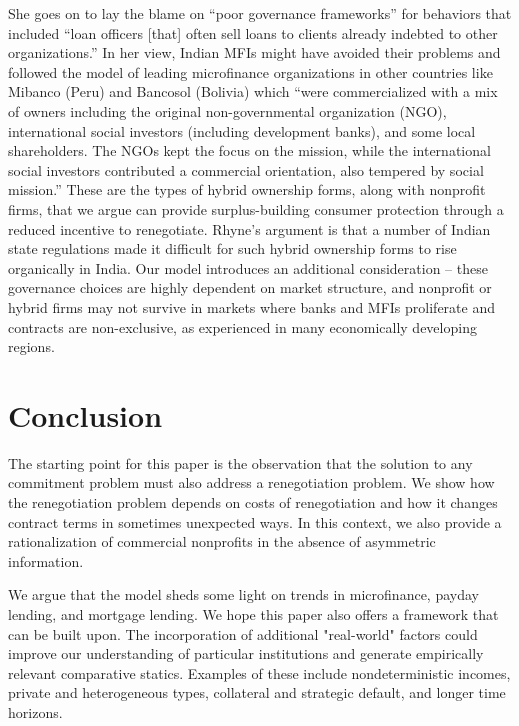 \documentclass[11pt,english]{article}
\theoremstyle{plain}
\theoremstyle{definition}
\begin{document}
She goes on to lay the blame on ``poor governance frameworks\textquotedblright{}
for behaviors that included ``loan officers {[}that{]} often sell
loans to clients already indebted to other organizations.'' In her
view, Indian MFIs might have avoided their problems and followed the
model of leading microfinance organizations in other countries like
Mibanco (Peru) and Bancosol (Bolivia) which ``were commercialized
with a mix of owners including the original non-governmental organization
(NGO), international social investors (including development banks),
and some local shareholders. The NGOs kept the focus on the mission,
while the international social investors contributed a commercial
orientation, also tempered by social mission.'' These are the types
of hybrid ownership forms, along with nonprofit firms, that we argue
can provide surplus-building consumer protection through a reduced
incentive to renegotiate. Rhyne's argument is that a number of Indian
state regulations made it difficult for such hybrid ownership forms
to rise organically in India. Our model introduces an additional consideration -- these governance
choices are highly dependent on market structure, and nonprofit or hybrid firms may not survive in markets where banks and MFIs proliferate and contracts are non-exclusive, as experienced in many economically developing regions.

\section{Conclusion}

The starting point for this paper is the observation that the solution
to any commitment problem must also address a renegotiation problem.
We show how the renegotiation problem depends on costs of renegotiation
and how it changes contract terms in sometimes unexpected ways. In
this context, we also provide a rationalization of commercial nonprofits
in the absence of asymmetric information.

We argue that the model sheds some light on trends in microfinance,
payday lending, and mortgage lending. We hope this paper also offers
a framework that can be built upon. The incorporation of additional
"real-world" factors could improve our understanding of particular
institutions and generate empirically relevant comparative statics.
Examples of these include nondeterministic incomes, private and heterogeneous types, collateral and strategic default, and longer time horizons.
\end{document}
